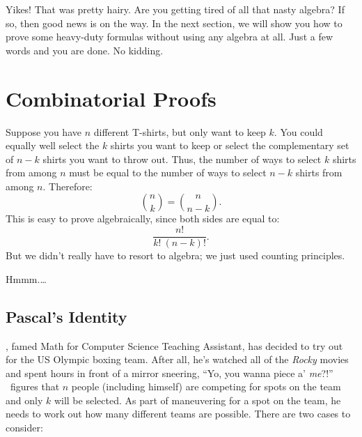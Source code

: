 Yikes!  That was pretty hairy.  Are you getting tired of all that
nasty algebra?  If so, then good news is on the way.  In the next
section, we will show you how to prove some heavy-duty formulas
without using any algebra at all.  Just a few words and you are done.
No kidding.

\begin{problems}
\practiceproblems
{}


\classproblems
{}

\homeworkproblems
{}

\examproblems
{}

\end{problems}


\section{Combinatorial Proofs}\label{combinatorial_proof_sec}

Suppose you have $n$ different T-shirts, but only want to keep $k$.
You could equally well select the $k$ shirts you want to keep or
select the complementary set of $n - k$ shirts you want to throw out.
Thus, the number of ways to select $k$ shirts from among $n$ must be
equal to the number of ways to select $n - k$ shirts from among $n$.
Therefore:
%
\[
    \binom{n}{k} = \binom{n}{n-k}.
\]
%
This is easy to prove algebraically, since both sides are equal to:
%
\[
    \frac{n!}{k!\ (n-k)!}.
\]
%
But we didn't really have to resort to algebra; we just used counting
principles.

Hmmm.\dots

\subsection{Pascal's Identity}

\Jay, famed Math for Computer Science Teaching Assistant, has decided
to try out for the US Olympic boxing team.  After all, he's watched
all of the \emph{Rocky} movies and spent hours in front of a mirror
sneering, ``Yo, you wanna piece a' \emph{me}?!''  \Jay\ figures that $n$
people (including himself) are competing for spots on the team and
only $k$ will be selected.  As part of maneuvering for a spot on the
team, he needs to work out how many different teams are possible.
There are two cases to consider:

